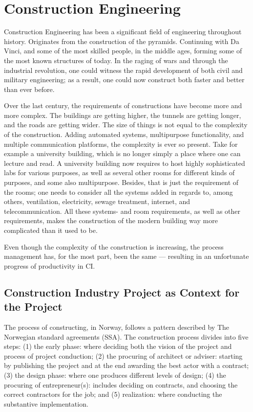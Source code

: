\section{Construction Engineering}
Construction Engineering has been a significant field of engineering throughout history. Originates from the construction of the pyramids. Continuing with Da Vinci, and some of the most skilled people, in the middle ages, forming some of the most known structures of today. In the raging of wars and through the industrial revolution, one could witness the rapid development of both civil and military engineering; as a result, one could now construct both faster and better than ever before.

Over the last century, the requirements of constructions have become more and more complex. The buildings are getting higher, the tunnels are getting longer, and the roads are getting wider. The size of things is not equal to the complexity of the construction. Adding automated systems, multipurpose functionality, and multiple communication platforms, the complexity is ever so present. Take for example a university building, which is no longer simply a place where one can lecture and read. A university building now requires to host highly sophisticated labs for various purposes, as well as several other rooms for different kinds of purposes, and some also multipurpose. Besides, that is just the requirement of the rooms; one needs to consider all the systems added in regards to, among others, ventilation, electricity, sewage treatment, internet, and telecommunication. All these systems- and room requirements, as well as other requirements, makes the construction of the modern building way more complicated than it used to be. 

Even though the complexity of the construction is increasing, the process management has, for the most part, been the same — resulting in an unfortunate progress of productivity in CI. 

\subsection{Construction Industry Project as Context for the Project} \label{sec:CI_context}
The process of constructing, in Norway, follows a pattern described by The Norwegian standard agreements (SSA). The construction process divides into five steps: (1) the early phase: where deciding both the vision of the project and process of project conduction; (2) the procuring of architect or adviser: starting by publishing the project and at the end awarding the best actor with a contract; (3) the design phase: where one produces different levels of  design; (4) the procuring of entrepreneur(s): includes deciding on contracts, and choosing the correct contractors for the job; and (5) realization: where conducting the substantive implementation. 

